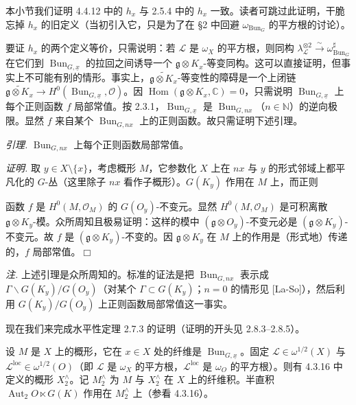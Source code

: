  本小节我们证明 4.4.12 中的 $h_{x}$ 与 2.5.4 中的 $h_{x}$ 一致。读者可跳过此证明，干脆忘掉 $h_{x}$ 的旧定义（当初引入它，只是为了在 §2 中回避 $\omega_{\operatorname{Bun}_{G}}$ 的平方根的讨论）。

要证 $h_{x}$ 的两个定义等价，只需说明：若 $\mathcal{L}$ 是 $\omega_{X}$ 的平方根，则同构 $\lambda_{\mathcal{L}}^{\otimes 2}\xrightarrow{\ \sim\ }\omega^{\sharp}_{\operatorname{Bun}_{G}}$ 在它们到 $\operatorname{Bun}_{G,\underline{x}}$ 的拉回之间诱导一个 $\mathfrak{g}\otimes K_{x}$-等变同构。这可以直接证明，但事实上不可能有别的情形。事实上，$\widetilde{\mathfrak{g}\otimes K_{x}}$-等变性的障碍是一个上闭链 $\widetilde{\mathfrak{g}\otimes K_{x}}\to H^{0}(\operatorname{Bun}_{G,\underline{x}},\mathcal{O})$。因 $\operatorname{Hom}(\mathfrak{g}\otimes K_{x},\mathbb{C})=0$，只需说明 $\operatorname{Bun}_{G,\underline{x}}$ 上每个正则函数 $f$ 局部常值。按 2.3.1，$\operatorname{Bun}_{G,\underline{x}}$ 是 $\operatorname{Bun}_{G,nx}$（$n\in\mathbb{N}$）的逆向极限。显然 $f$ 来自某个 $\operatorname{Bun}_{G,nx}$ 上的正则函数。故只需证明下述引理。

\emph{引理.} $\operatorname{Bun}_{G,nx}$ 上每个正则函数局部常值。

\emph{证明.} 取 $y\in X\setminus\{x\}$，考虑概形 $M$，它参数化 $X$ 上在 $nx$ 与 $y$ 的形式邻域上都平凡化的 $G$-丛（这里除子 $nx$ 看作子概形）。$G(K_{y})$ 作用在 $M$ 上，而正则


函数 $f$ 是 $H^{0}(M,\mathcal{O}_{M})$ 的 $G(O_{y})$-不变元。显然 $H^{0}(M,\mathcal{O}_{M})$ 是可积离散 $\mathfrak{g}\otimes K_{y}$-模。众所周知且极易证明：这样的模中 $(\mathfrak{g}\otimes O_{y})$-不变元必是 $(\mathfrak{g}\otimes K_{y})$-不变元。故 $f$ 是 $(\mathfrak{g}\otimes K_{y})$-不变的。因 $\mathfrak{g}\otimes K_{y}$ 在 $M$ 上的作用是（形式地）传递的，$f$ 局部常值。\hfill$\Box$

\emph{注.} 上述引理是众所周知的。标准的证法是把 $\operatorname{Bun}_{G,nx}$ 表示成 $\Gamma\backslash G(K_{y})/G(O_{y})$（对某个 $\Gamma\subset G(K_{y})$；$n=0$ 的情形见 [La-So]），然后利用 $G(K_{y})/G(O_{y})$ 上正则函数局部常值这一事实。

 现在我们来完成水平性定理 2.7.3 的证明（证明的开头见 2.8.3–2.8.5）。

设 $M$ 是 $X$ 上的概形，它在 $x\in X$ 处的纤维是 $\operatorname{Bun}_{G,\underline{x}}$。固定 $\mathcal{L}\in\omega^{1/2}(X)$ 与 $\mathcal{L}^{\mathrm{loc}}\in\omega^{1/2}(O)$（即 $\mathcal{L}$ 是 $\omega_{X}$ 的平方根，$\mathcal{L}^{\mathrm{loc}}$ 是 $\omega_{O}$ 的平方根）。则有 4.3.16 中定义的概形 $X_{2}^{\wedge}$。记 $M_{2}^{\wedge}$ 为 $M$ 与 $X_{2}^{\wedge}$ 在 $X$ 上的纤维积。半直积 $\operatorname{Aut}_{2}O\ltimes G(K)$ 作用在 $M_{2}^{\wedge}$ 上（参看 4.3.16）。

